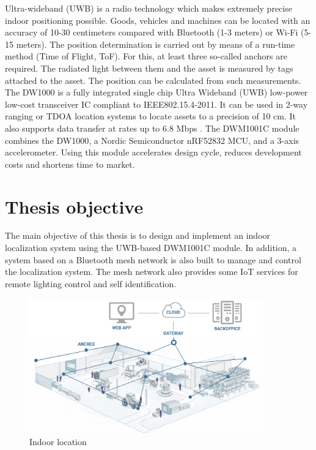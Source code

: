 \documentclass[\main/main.tex]{subfiles}
\begin{document}
Ultra-wideband (UWB) is a radio technology which makes extremely precise indoor positioning possible. Goods, vehicles and machines can be located with an accuracy of 10-30 centimeters compared with Bluetooth (1-3 meters) or Wi-Fi (5-15 meters). The position determination is carried out by means of a run-time method (Time of Flight, ToF). For this, at least three so-called anchors are required. The radiated light between them and the asset is measured by tags attached to the asset. The position can be calculated from such measurements.
\newline\newline
The DW1000 is a fully integrated single chip Ultra Wideband (UWB) low-power low-cost transceiver IC compliant to IEEE802.15.4-2011. It can be used in 2-way ranging or TDOA location systems to locate assets to a precision of 10 cm. It also supports data transfer at rates up to 6.8 Mbps \cite{decawave:dw1000_datasheet}.
\newline\newline
The DWM1001C module combines the DW1000, a Nordic Semiconductor nRF52832 MCU, and a 3-axis accelerometer. Using this module accelerates design cycle, reduces development costs and shortens time to market.

\section{Thesis objective}
The main objective of this thesis is to design and implement an indoor localization system using the UWB-based DWM1001C module. In addition, a system based on a Bluetooth mesh network is also built to manage and control the localization system. The mesh network also provides some IoT services for remote lighting control and self identification.

\begin{figure}[H]
    \begin{center}
        \includegraphics[width=0.9\textwidth]{fonctionnement-technologie-mesh-wirepas.jpg}
    \end{center}
    \caption{Indoor location}
    \label{fig:indoor_location}
\end{figure}

\bib
\end{document}
